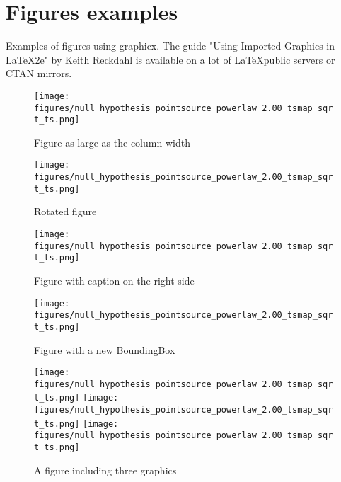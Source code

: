 \documentclass{aa}
\begin{document}
\section{Figures examples}
Examples of figures using graphicx. 
The guide "Using Imported Graphics in LaTeX2e" by Keith Reckdahl
is available on a lot of \LaTeX public servers or CTAN mirrors.


   \begin{figure}[h!]
   \centering
   \texttt{[image: figures/null\_hypothesis\_pointsource\_powerlaw\_2.00\_tsmap\_sqrt\_ts.png]}
      \caption{Figure as large as the column width}
         \label{fig1}
   \end{figure}
%
   \begin{figure}[h!]
   \centering
   \texttt{[image: figures/null\_hypothesis\_pointsource\_powerlaw\_2.00\_tsmap\_sqrt\_ts.png]}
      \caption{Rotated figure}
         \label{fig2}
   \end{figure}
%
   \begin{figure}[h!]
   \sidecaption
   \texttt{[image: figures/null\_hypothesis\_pointsource\_powerlaw\_2.00\_tsmap\_sqrt\_ts.png]}
      \caption{Figure with caption on the right side}
         \label{fig3}
   \end{figure}


   \begin{figure}
   \centering
   \texttt{[image: figures/null\_hypothesis\_pointsource\_powerlaw\_2.00\_tsmap\_sqrt\_ts.png]}
      \caption{Figure with a new BoundingBox}
         \label{fig4}
   \end{figure}



   \begin{figure}[h!]
   \centering
   \texttt{[image: figures/null\_hypothesis\_pointsource\_powerlaw\_2.00\_tsmap\_sqrt\_ts.png]}
   \texttt{[image: figures/null\_hypothesis\_pointsource\_powerlaw\_2.00\_tsmap\_sqrt\_ts.png]}
   \texttt{[image: figures/null\_hypothesis\_pointsource\_powerlaw\_2.00\_tsmap\_sqrt\_ts.png]}
      \caption{A figure including three graphics}
         \label{fig5}
   \end{figure}
\end{document}
